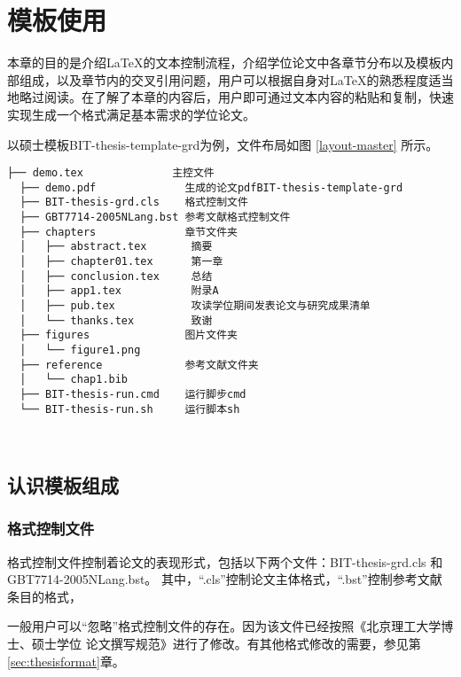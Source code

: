 
\chapter{模板使用}
\label{chap:textStructure}

本章的目的是介绍\LaTeX{}的文本控制流程，介绍学位论文中各章节分布以及模板内部组成，以及章节内的交叉引用问题，用户可以根据自身对\LaTeX{}的熟悉程度适当地略过阅读。在了解了本章的内容后，用户即可通过文本内容的粘贴和复制，快速实现生成一个格式满足基本需求的学位论文。

以硕士模板BIT-thesis-template-grd为例，文件布局如图 \ref{layout-master} 所示。 

\begin{lstlisting}[basicstyle=\small\ttfamily,caption={BIT-thesis-template-grd 模板文件布局},label=layout-master,numbers=none]
  ├── demo.tex              主控文件
  ├── demo.pdf              生成的论文pdfBIT-thesis-template-grd
  ├── BIT-thesis-grd.cls    格式控制文件
  ├── GBT7714-2005NLang.bst 参考文献格式控制文件
  ├── chapters              章节文件夹
  │   ├── abstract.tex       摘要
  │   ├── chapter01.tex      第一章
  │   ├── conclusion.tex     总结
  │   ├── app1.tex           附录A
  │   ├── pub.tex            攻读学位期间发表论文与研究成果清单
  │   └── thanks.tex         致谢
  ├── figures               图片文件夹
  │   └── figure1.png   
  ├── reference             参考文献文件夹
  │   └── chap1.bib
  ├── BIT-thesis-run.cmd    运行脚步cmd
  └── BIT-thesis-run.sh     运行脚本sh
  
      
\end{lstlisting}

\section{认识模板组成}

\subsection{格式控制文件}
\label{sec:format}

格式控制文件控制着论文的表现形式，包括以下两个文件：BIT-thesis-grd.cls 和 GBT7714-2005NLang.bst。
其中，``.cls''控制论文主体格式，``.bst''控制参考文献条目的格式，

一般用户可以``忽略''格式控制文件的存在。因为该文件已经按照《北京理工大学博士、硕士学位
论文撰写规范》进行了修改。有其他格式修改的需要，参见第\ref{sec:thesisformat}章。


